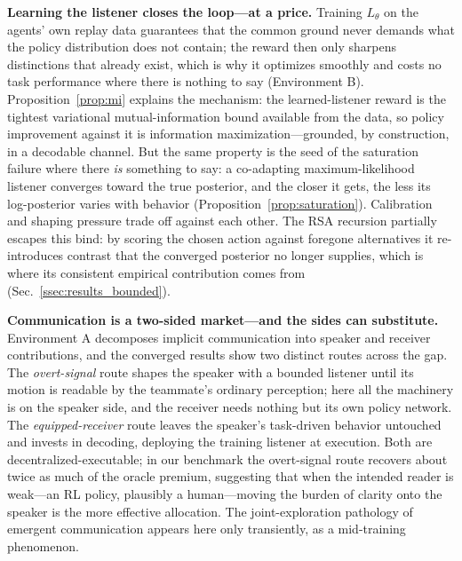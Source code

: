 \documentclass{article}
\newcommand{\Ltheta}{L_\theta}
\begin{document}
\textbf{Learning the listener closes the loop---at a price.} Training $\Ltheta$ on the agents' own replay data guarantees that the common ground never demands what the policy distribution does not contain; the reward then only sharpens distinctions that already exist, which is why it optimizes smoothly and costs no task performance where there is nothing to say (Environment B). Proposition~\ref{prop:mi} explains the mechanism: the learned-listener reward is the tightest variational mutual-information bound available from the data, so policy improvement against it is information maximization---grounded, by construction, in a decodable channel. But the same property is the seed of the saturation failure where there \emph{is} something to say: a co-adapting maximum-likelihood listener converges toward the true posterior, and the closer it gets, the less its log-posterior varies with behavior (Proposition~\ref{prop:saturation}). Calibration and shaping pressure trade off against each other. The RSA recursion partially escapes this bind: by scoring the chosen action against foregone alternatives it re-introduces contrast that the converged posterior no longer supplies, which is where its consistent empirical contribution comes from (Sec.~\ref{ssec:results_bounded}).

\textbf{Communication is a two-sided market---and the sides can substitute.} Environment A decomposes implicit communication into speaker and receiver contributions, and the converged results show two distinct routes across the gap. The \emph{overt-signal} route shapes the speaker with a bounded listener until its motion is readable by the teammate's ordinary perception; here all the machinery is on the speaker side, and the receiver needs nothing but its own policy network. The \emph{equipped-receiver} route leaves the speaker's task-driven behavior untouched and invests in decoding, deploying the training listener at execution. Both are decentralized-executable; in our benchmark the overt-signal route recovers about twice as much of the oracle premium, suggesting that when the intended reader is weak---an RL policy, plausibly a human---moving the burden of clarity onto the speaker is the more effective allocation. The joint-exploration pathology of emergent communication \cite{eccles2019biases} appears here only transiently, as a mid-training phenomenon.
\end{document}
